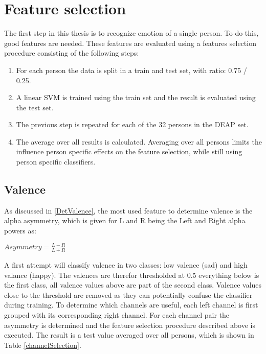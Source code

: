 
\section{Feature selection}

The first step in this thesis is to recognize emotion of a single person. To do this, good features are needed. These features are evaluated using a features selection procedure consisting of the following steps:
\begin{enumerate}
\item For each person the data is split in a train and test set, with ratio: 0.75 / 0.25.
\item A linear SVM is trained using the train set and the result is evaluated using the test set. 
\item The previous step is repeated for each of the 32 persons in the DEAP set.
\item The average over all results is calculated. Averaging over all persons limits the influence person specific effects on the feature selection, while still using person specific classifiers.
\end{enumerate}

\subsection{Valence}
As discussed in \ref{DetValence}, the most used feature to determine valence is the alpha asymmetry, which is given for L and R being the Left and Right alpha powers as:\\
\begin{center}
$Asymmetry = \frac{L-R}{L+R}$
\end{center}
A first attempt will classify valence in two classes: low valence (sad) and high valance (happy). The valences are therefor thresholded at 0.5 everything below is the first class, all valence values above are part of the second class. Valence values close to the threshold are removed as they can potentially confuse the classifier during training. To determine which channels are useful, each left channel is first grouped with its corresponding right channel. For each channel pair the asymmetry is determined and the feature selection procedure described above is executed. The result is a test value averaged over all persons, which is shown in Table \ref{channelSelection}.

